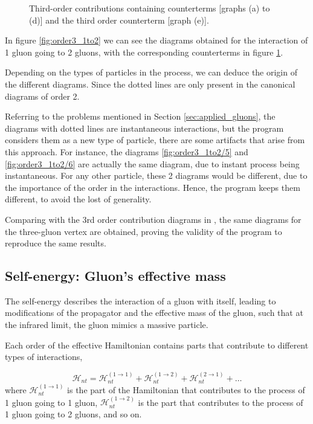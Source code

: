 \documentclass[11pt,a4paper,twoside,pdf]{article}
\numberwithin{equation}{section}
\begin{document}
\begin{figure}[h!]
\begin{subfigure}[t]{0.24\textwidth}
        \caption{ }
    \end{subfigure}%
    \caption{Third-order contributions containing counterterms [graphs (a) to (d)] and the third order
    counterterm [graph (e)].}
    \label{fig:order3_1to2/counterterms}
\end{figure}


In figure \ref{fig:order3_1to2} we can see the diagrams obtained for the interaction
of 1 gluon going to 2 gluons, with the corresponding counterterms in figure
\ref{fig:order3_1to2/counterterms}. 

Depending on the types of particles in the process, we can deduce the origin of the 
different diagrams. Since the dotted lines are only present in the canonical diagrams 
of order 2.

Referring to the problems mentioned in Section \ref{sec:applied_gluons}, the diagrams 
with dotted lines are instantaneous interactions, but the program considers them
as a new type of particle, there are some artifacts that arise from this
approach. For instance, the diagrams \ref{fig:order3_1to2/5} and \ref{fig:order3_1to2/6} are actually the same 
diagram, due to instant process being instantaneous. For any other particle, these 
2 diagrams would be different, due to the importance of the order in the interactions.
Hence, the program keeps them different, to avoid the lost of generality.

Comparing with the 3rd order contribution diagrams in \cite{QCDG}, the same diagrams
for the three-gluon vertex are obtained, proving the validity of the program to reproduce the same results.

\subsection{Self-energy: Gluon's effective mass}

The self-energy describes the interaction of a gluon with itself, leading to 
modifications of the propagator and the effective mass of the gluon, such that 
at the infrared limit, the gluon mimics a massive particle.

Each order of the effective Hamiltonian contains parts that contribute to different 
types of interactions, 

\begin{equation}
    \mathcal{H}_{n t} = \mathcal{H}_{n t}^{(1 \rightarrow 1)} + \mathcal{H}_{n t}^{(1 \rightarrow 2)} + 
    \mathcal{H}_{n t}^{(2 \rightarrow 1)} + \ldots
\end{equation}
where $\mathcal{H}_{n t}^{(1 \rightarrow 1)}$ is the part of the Hamiltonian that
contributes to the process of 1 gluon going to 1 gluon, $\mathcal{H}_{n t}^{(1 \rightarrow 2)}$ 
is the part that contributes to the process of 1 gluon going to 2 gluons, and so on.
\end{document}
